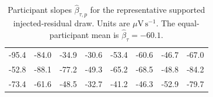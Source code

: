 \begin{table}[H]
\centering
\caption{Participant slopes \(\widehat\beta_{\tau,p}\) for the representative supported injected-residual draw. Units are \(\mu\mathrm{V\,s^{-1}}\). The equal-participant mean is \(\widehat\beta_\tau=-60.1\).}
\label{tab:si-worked-slopes}
\footnotesize
\begin{tabular}{rrrrrrrr}
\toprule
-95.4 & -84.0 & -34.9 & -30.6 & -53.4 & -60.6 & -46.7 & -67.0 \\
-52.8 & -88.1 & -77.2 & -49.3 & -65.2 & -68.5 & -48.8 & -84.2 \\
-73.4 & -61.6 & -48.5 & -32.7 & -41.2 & -46.3 & -52.9 & -79.7 \\
\bottomrule
\end{tabular}
\end{table}
